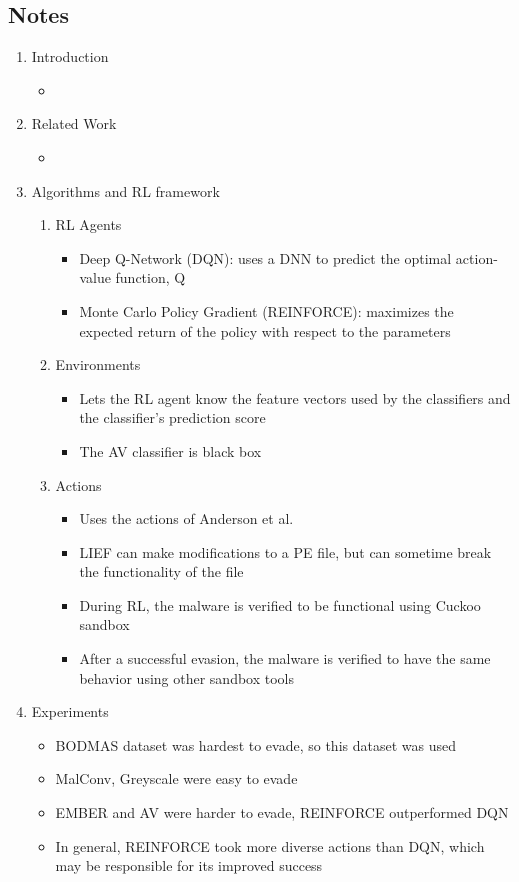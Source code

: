 \documentclass{article}
\begin{document}
\subsection*{Notes}

\begin{enumerate}
	\item Introduction
	\begin{itemize}
		\item 
	\end{itemize}
	\item Related Work
	\begin{itemize}
		\item 
	\end{itemize}
	\item Algorithms and RL framework
	\begin{enumerate}
		\item RL Agents
		\begin{itemize}
			\item Deep Q-Network (DQN): uses a DNN to predict the optimal action-value function, Q
			\item Monte Carlo Policy Gradient (REINFORCE): maximizes the expected return of the policy with respect to the parameters 
		\end{itemize}
		\item Environments
		\begin{itemize}
			\item Lets the RL agent know the feature vectors used by the classifiers and the classifier's prediction score
			\item The AV classifier is black box
		\end{itemize}
		\item Actions
		\begin{itemize}
			\item Uses the actions of Anderson et al.
			\item LIEF can make modifications to a PE file, but can sometime break the functionality of the file
			\item During RL, the malware is verified to be functional using Cuckoo sandbox
			\item After a successful evasion, the malware is verified to have the same behavior using other sandbox tools
		\end{itemize}
	\end{enumerate}
	\item Experiments
	\begin{itemize}
		\item BODMAS dataset was hardest to evade, so this dataset was used
		\item MalConv, Greyscale were easy to evade
		\item EMBER and AV were harder to evade, REINFORCE outperformed DQN
		\item In general, REINFORCE took more diverse actions than DQN, which may be responsible for its improved success
	\end{itemize}
\end{enumerate}
\pagebreak
\end{document}
